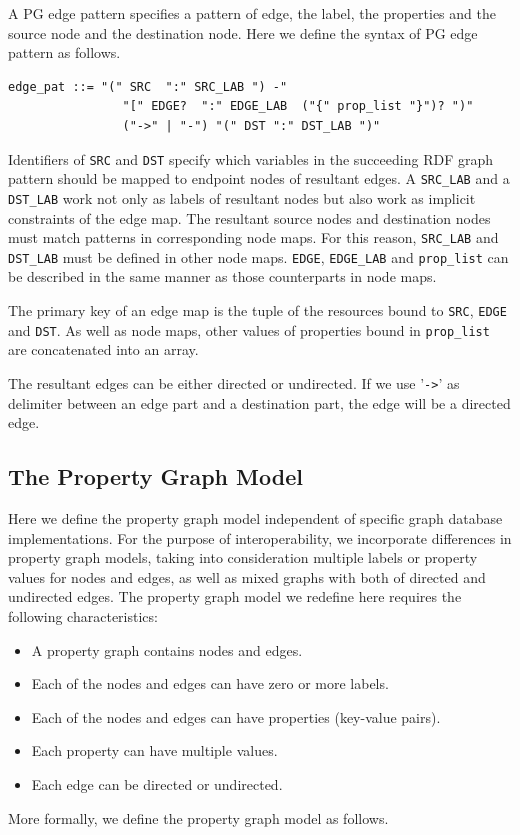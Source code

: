 \documentclass[runningheads]{llncs}
\begin{document}
A PG edge pattern specifies a pattern of edge, the label, the properties and the source node and the destination node.
Here we define the syntax of PG edge pattern as follows.
\begin{defi}
\leavevmode
\begin{verbatim}
edge_pat ::= "(" SRC  ":" SRC_LAB ") -" 
                "[" EDGE?  ":" EDGE_LAB  ("{" prop_list "}")? ")" 
                ("->" | "-") "(" DST ":" DST_LAB ")"
\end{verbatim}
\end{defi}

 Identifiers of \texttt{SRC} and \texttt{DST} specify which variables in the succeeding RDF graph pattern should be mapped to endpoint nodes of resultant edges.
A \texttt{SRC\_LAB} and a \texttt{DST\_LAB} work not only as labels of resultant nodes but also work as implicit constraints of the edge map.
The resultant source nodes and destination nodes must match patterns in corresponding node maps.
For this reason, \texttt{SRC\_LAB} and \texttt{DST\_LAB} must be defined in other node maps.
\texttt{EDGE}, \texttt{EDGE\_LAB} and \texttt{prop\_list} can be described in the same manner as those counterparts in node maps.

The primary key of an edge map is the tuple of the resources bound to \texttt{SRC}, \texttt{EDGE} and \texttt{DST}. As well as node maps, other values of properties bound in \texttt{prop\_list} are concatenated into an array. 

The resultant edges can be either directed or undirected. If we use '\texttt{->}' as delimiter between an edge part and a destination part, the edge will be a directed edge.

\subsection{The Property Graph Model}
Here we define the property graph model independent of specific graph database implementations. For the purpose of interoperability, we incorporate differences in property graph models, taking into consideration multiple labels or property values for nodes and edges, as well as mixed graphs with both of directed and undirected edges. The property graph model we redefine here requires the following characteristics:

\begin{itemize}
    \item A property graph contains nodes and edges.
    \item Each of the nodes and edges can have zero or more labels.
    \item Each of the nodes and edges can have properties (key-value pairs).
    \item Each property can have multiple values.
    \item Each edge can be directed or undirected.
\end{itemize}
More formally, we define the property graph model as follows.
\end{document}
